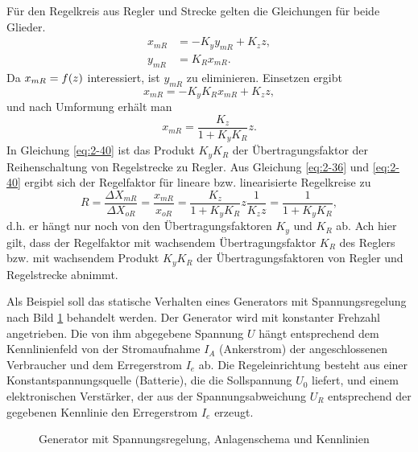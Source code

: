 Für den Regelkreis aus Regler und Strecke gelten die Gleichungen für beide Glieder.
\begin{align}
    x_{mR} &= -K_y y_{mR} + K_z z,\\
    y_{mR} &= K_R x_{mR}.
\end{align}
Da \(x_{mR} = f\parentheses*{z}\) interessiert, ist \(y_{mR}\) zu eliminieren.
Einsetzen ergibt
\begin{equation}
    x_{mR} = -K_y K_R x_{mR} + K_z z,
\end{equation}
und nach Umformung erhält man
\begin{equation}\label{eq:2-40}
    x_{mR} = \frac{K_z}{1 + K_y K_R}z.
\end{equation}
In Gleichung \eqref{eq:2-40} ist das Produkt \(K_y K_R\) der Übertragungsfaktor der Reihenschaltung von Regelstrecke zu Regler.
Aus Gleichung \eqref{eq:2-36} und \eqref{eq:2-40} ergibt sich der Regelfaktor für lineare bzw. linearisierte Regelkreise zu
\begin{equation}\label{eq:2-41}
    R = \frac{\Delta X_{mR}}{\Delta X_{oR}} = \frac{x_{mR}}{x_{oR}} = \frac{K_z}{1 + K_y K_R}z\frac{1}{K_z z} = \frac{1}{1 + K_y K_R},
\end{equation}
d.h. er hängt nur noch von den Übertragungsfaktoren \(K_y\) und \(K_R\) ab.
Ach hier gilt, dass der Regelfaktor mit wachsendem Übertragungsfaktor \(K_R\) des Reglers bzw. mit wachsendem Produkt \(K_y K_R\) der Übertragungsfaktoren von Regler und Regelstrecke abnimmt.

Als Beispiel soll das statische Verhalten eines Generators mit Spannungsregelung nach Bild \ref{fig:2-11} behandelt werden.
Der Generator wird mit konstanter Frehzahl angetrieben.
Die von ihm abgegebene Spannung \(U\) hängt entsprechend dem Kennlinienfeld von der Stromaufnahme \(I_A\) (Ankerstrom) der angeschlossenen Verbraucher und dem Erregerstrom \(I_e\) ab.
Die Regeleinrichtung besteht aus einer Konstantspannungsquelle (Batterie), die die Sollspannung \(U_0\) liefert, und einem elektronischen Verstärker, der aus der Spannungsabweichung \(U_R\) entsprechend der gegebenen Kennlinie den Erregerstrom \(I_e\) erzeugt.

\begin{figure}[h]
    \centering
    \caption{Generator mit Spannungsregelung, Anlagenschema und Kennlinien}
    \label{fig:2-11}
\end{figure}

